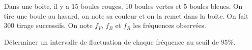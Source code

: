 
Dans une boite, il y a 15 boules rouges, 10 boules vertes et 5 boules bleues. On tire une boule au hasard, on note sa couleur et on la remet dans la boite. On fait 300 tirage successifs. On note $f_V$, $f_B$ et $f_R$ les fréquences observées.

Déterminer un intervalle de fluctuation de chaque fréquence au seuil de 95\%.